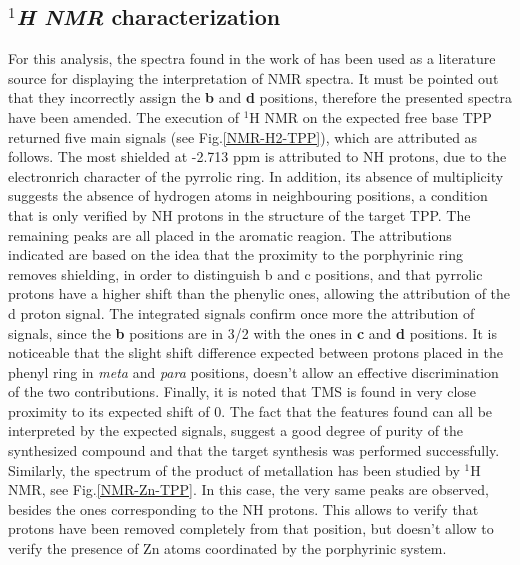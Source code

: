 \documentclass[num-refs]{wiley-article}
\begin{document}
\subsection{\textit{$^{1}$H NMR} characterization}
For this analysis, the spectra found in the work of \citet{anjali_zinc-tetraphenylporphyrin_2020} has been used as a literature source for displaying the interpretation of NMR spectra.
It must be pointed out that they incorrectly assign the \textbf{b} and \textbf{d} positions, therefore the presented spectra have been amended.
The execution of $^{1}$H NMR on the expected free base TPP returned five main signals (see Fig.\ref{NMR-H2-TPP}), which are attributed as follows.
The most shielded at -2.713 ppm is attributed to NH protons, due to the electronrich character of the pyrrolic ring. 
In addition, its absence of multiplicity suggests the absence of hydrogen atoms in neighbouring positions, a condition that is only verified by NH protons in the structure of the target TPP.
The remaining peaks are all placed in the aromatic reagion. 
The attributions indicated are based on the idea that the proximity to the porphyrinic ring removes shielding, in order to distinguish b and c positions, and that pyrrolic protons have a higher shift than the phenylic ones, allowing the attribution of the d proton signal.
The integrated signals confirm once more the attribution of signals, since the \textbf{b} positions are in 3/2 with the ones in \textbf{c} and \textbf{d} positions.
It is noticeable that the slight shift difference expected between protons placed in the phenyl ring in \textit{meta} and \textit{para} positions, doesn't allow an effective discrimination of the two contributions.
Finally, it is noted that TMS is found in very close proximity to its expected shift of 0.
The fact that the features found can all be interpreted by the expected signals, suggest a good degree of purity of the synthesized compound and that the target synthesis was performed successfully.\\
Similarly, the spectrum of the product of metallation has been studied by $^{1}$H NMR, see Fig.\ref{NMR-Zn-TPP}.
In this case, the very same peaks are observed, besides the ones corresponding to the NH protons.
This allows to verify that protons have been removed completely from that position, but doesn't allow to verify the presence of Zn atoms coordinated by the porphyrinic system.
\end{document}
